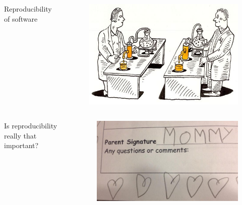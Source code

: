\documentclass{beamer}
\begin{document}
\begin{frame}
    \begin{columns}
        \begin{column}{0.5\textwidth}
            Reproducibility of software
        \end{column}
        \begin{column}{0.5\textwidth}
            \begin{figure}
                \centering
                \includegraphics[width=\textwidth,keepaspectratio]{../resources/reproducibility.jpg}
            \end{figure}
        \end{column}
    \end{columns}
\end{frame}

\begin{frame}
    \begin{columns}
        \begin{column}{0.5\textwidth}
            Is reproducibility really that important?
        \end{column}
        \begin{column}{0.5\textwidth}
            \begin{figure}
                \centering
                \includegraphics[width=\textwidth,keepaspectratio]{../resources/signature.jpg}
            \end{figure}
        \end{column}
    \end{columns}
\end{frame}
\end{document}
